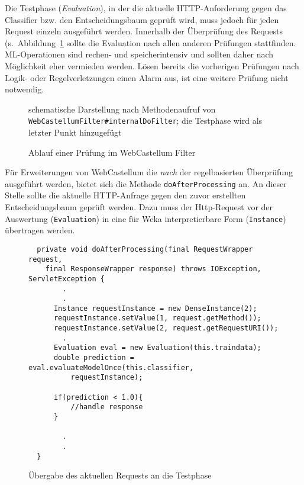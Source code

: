 Die Testphase (\emph{Evaluation}), in der die aktuelle HTTP-Anforderung gegen das Classifier bzw. den Entscheidungsbaum geprüft wird, muss jedoch für jeden Request einzeln ausgeführt werden. Innerhalb der Überprüfung des Requests (s.~Abbildung~\ref{fig:wcfilter} sollte die Evaluation nach allen anderen Prüfungen stattfinden. ML-Operationen sind rechen- und speicherintensiv und sollten daher nach Möglichkeit eher vermieden werden. Lösen bereits die vorherigen Prüfungen nach Logik- oder Regelverletzungen einen Alarm aus, ist eine weitere Prüfung nicht notwendig.\\

\begin{figure}[h]
  \centering
  
  \caption{Ablauf einer Prüfung im WebCastellum Filter}
  \label{fig:wcfilter}
  \medskip
  \small
  schematische Darstellung nach Methodenaufruf von \verb=WebCastellumFilter#internalDoFilter=; die Testphase wird als letzter Punkt hinzugefügt
\end{figure}

Für Erweiterungen von WebCastellum die \emph{nach} der regelbasierten Überprüfung ausgeführt werden, bietet sich die Methode \verb=doAfterProcessing= an. An dieser Stelle sollte die aktuelle HTTP-Anfrage gegen den zuvor erstellten Entscheidungsbaum geprüft werden. Dazu muss der Http-Request vor der Auswertung (\verb=Evaluation=) in eine für Weka interpretierbare Form (\verb=Instance=) übertragen werden.\\

\begin{figure}[h]
  \centering
  \begin{lstlisting}
  private void doAfterProcessing(final RequestWrapper request,
    final ResponseWrapper response) throws IOException, ServletException {
        .
        .
      Instance requestInstance = new DenseInstance(2);
      requestInstance.setValue(1, request.getMethod());
      requestInstance.setValue(2, request.getRequestURI());
        .
      Evaluation eval = new Evaluation(this.traindata);
      double prediction = eval.evaluateModelOnce(this.classifier,
          requestInstance);

      if(prediction < 1.0){
          //handle response
      }
     
        .
        .
  }
\end{lstlisting}
\caption{Übergabe des aktuellen Requests an die Testphase}
\label{fig:wekatest}

\end{figure}

